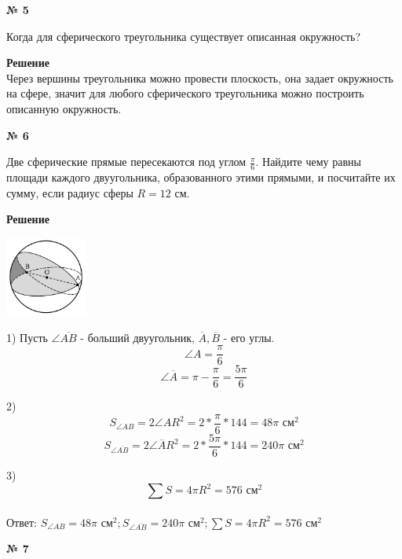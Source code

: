     \begin{center}
        \textbf{№ 5}
    \end{center}
    Когда для сферического треугольника существует описанная окружность?

    \textbf{Решение}\\

    Через вершины треугольника можно провести плоскость, она задает окружность на сфере,
    значит для любого сферического треугольника можно построить описанную окружность.

    \begin{center}
        \textbf{№ 6}
    \end{center}
    Две сферические прямые пересекаются под углом $\frac{\pi}{6}$.
    Найдите чему равны площади каждого двуугольника, образованного этими прямыми, и посчитайте их сумму,
    если радиус сферы $R=12$ см.

    \textbf{Решение}\\

    \begin{center}
        \includegraphics[width=0.2\textwidth]{images/img3}\\
    \end{center}


    1) Пусть $\angle \overline {AB}$ - больший двуугольник, $\overline A, \overline B$ - его углы.
    \[
        \angle A = \frac{\pi}{6}
    \]
    \[ \angle \overline A = \pi - \frac{\pi}{6} = \frac{5\pi}{6}\]

    2)
    \[
        S_{\angle AB} = 2\angle A R ^ 2 = 2 * \frac{\pi}{6} *  144 = 48\pi \text{ см}^2
    \]
    \[
        S_{\angle \overline{AB}} = 2\angle \overline A R ^ 2 = 2 * \frac{5\pi}{6} *  144 = 240\pi \text{ см}^2
    \]

    3)
    \[
        \sum S = 4\pi R ^ 2 = 576 \text{ см}^2
    \]\\

    Ответ: $S_{\angle AB} = 48\pi \text{ см}^2; S_{\angle \overline{AB}} = 240\pi \text{ см}^2; \sum S = 4\pi R ^ 2 = 576 \text{ см}^2$

    \begin{center}
        \textbf{№ 7}
    \end{center}

